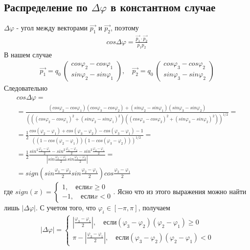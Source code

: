 \documentclass[12pt]{article}
\renewcommand{\l}{\left( }
\renewcommand{\r}{\right) }
\renewcommand{\phi}{\varphi}
\newcommand{\br}[1]{\l {#1} \r}
\newcommand{\abs}[1]{\left| #1 \right|}
\begin{document}
\subsection{Распределение по $\Delta \phi$ в константном случае}
$\Delta \phi$ - угол между векторами $\vec{p_1}$ и $\vec{p_2}$, поэтому
\begin{eqnarray}
cos \Delta \phi = \frac{\vec{p_1} \cdot \vec{p_2}}{p_1 p_2}
\end{eqnarray}
В нашем случае
\begin{eqnarray}
\vec{p_1} = q_0 \
\begin{pmatrix}
cos \phi_2 - cos \phi_1 \\
sin \phi_2 - sin \phi_1
\end{pmatrix}
,\quad\vec{p_2} = q_0 \
\begin{pmatrix}
cos \phi_3 - cos \phi_2 \\
sin \phi_3 - sin \phi_2
\end{pmatrix}
\end{eqnarray}
Следовательно
\begin{gather}
cos \Delta \phi = \nonumber \\
 =\frac{\br{cos \phi_2 - cos \phi_1}\br{cos \phi_3 - cos \phi_2} + \br{sin \phi_2 - sin \phi_1} \br{sin \phi_3 - sin \phi_2} }{\br{\br{ \br{cos \phi_2 - cos \phi_1}^2 + \br{sin \phi_2 - sin \phi_1}^2} \br{ \br{cos \phi_3 - cos \phi_2}^2 + \br{sin \phi_3 - sin \phi_2}^2}}^{1/2}} = \nonumber \\
= \frac{1}{2} \frac{cos\br{\phi_2 - \phi_1} + cos\br{\phi_3 - \phi_2} - cos\br{\phi_3 -\phi_1} - 1}{\br{\br{1 - cos \br{\phi_2-\phi_1}} \br{1 - cos\br{\phi_3 - \phi_2}}}^{1/2}} = \nonumber \\
= \frac{1}{2} \frac{sin^2\frac{\phi_3 -\phi_1}{2} - sin^2 \frac{\phi_3 -\phi_2}{2} - sin^2 \frac{\phi_2 -\phi_1}{2}}{\abs{sin\frac{\phi_2 -\phi_1}{2} sin\frac{\phi_3 - \phi_2}{2}}} = \nonumber\\
=sign\br{sin\frac{\phi_3 -\phi_2}{2} sin\frac{\phi_2-\phi_1}{2}} cos\frac{\phi_3 - \phi_1}{2}
\end{gather}
где $sign\br{x} = \begin{cases} 1,\quad \text{если} x \ge 0 \\ -1,\quad \text{если} x < 0\end{cases}$. \newline
Ясно что из этого выражения можно найти лишь $\abs{\Delta \phi}$. С учетом того, что $\phi_i \in \left[-\pi, \pi \right]$, получаем
\begin{eqnarray}
\label{DeltaPhi}
\abs{\Delta \phi} = 
\begin{cases}
\abs{\frac{\phi_3 - \phi_1}{2}},\quad \text{если} \br{\phi_3 -\phi_2} \br{\phi_2 -\phi_1} \ge 0 \\
\pi - \abs{\frac{\phi_3 - \phi_1}{2}},\quad \text{если} \br{\phi_3 -\phi_2} \br{\phi_2 -\phi_1} < 0
\end{cases}
\end{eqnarray}
\end{document}
